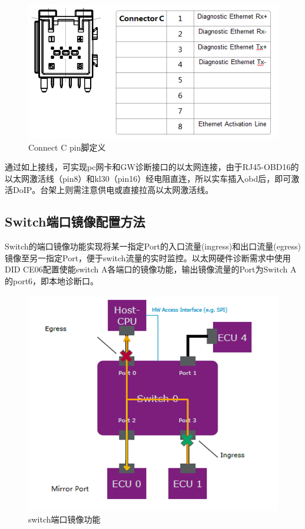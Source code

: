 \begin{figure}[ht]
    \centering
    \includegraphics[scale=0.6]{pic/connect_c_pin.png}
    \caption{Connect C pin脚定义}
    \label{fig:connect_c_pin}
\end{figure}

通过如上接线，可实现pc网卡和GW诊断接口的以太网连接，由于RJ45-OBD16的以太网激活线（pin8）和kl30（pin16）经电阻直连，所以实车插入obd后，即可激活DoIP。台架上则需注意供电或直接拉高以太网激活线。

\subsection{Switch端口镜像配置方法}

Switch的端口镜像功能实现将某一指定Port的入口流量(ingress)和出口流量(egress)镜像至另一指定Port，便于switch流量的实时监控。以太网硬件诊断需求中使用DID CE06配置使能switch A各端口的镜像功能，输出镜像流量的Port为Switch A的port6，即本地诊断口。

\begin{figure}[ht]
    \centering
    \includegraphics[scale=0.6]{pic/switch_mirror.png}
    \caption{switch端口镜像功能}
    \label{fig:switch_mirror}
\end{figure}

